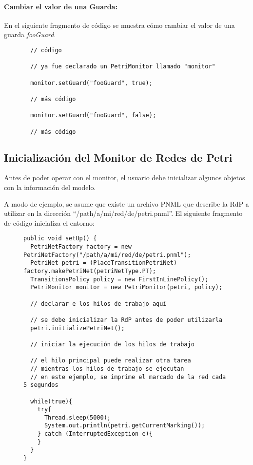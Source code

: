\paragraph{Cambiar el valor de una Guarda:} En el siguiente fragmento de código
se muestra cómo cambiar el valor de una guarda \textit{fooGuard}.

\begin{figure}[H]
\centering
\begin{verbatim}
  // código
  
  // ya fue declarado un PetriMonitor llamado "monitor"
  
  monitor.setGuard("fooGuard", true);
  
  // más código
  
  monitor.setGuard("fooGuard", false);
  
  // más código
\end{verbatim}
\end{figure}

\subsection{Inicialización del Monitor de Redes de Petri}

Antes de poder operar con el monitor, el usuario debe inicializar algunos
objetos con la información del modelo.

A modo de ejemplo, se asume que existe un archivo PNML que describe la RdP a
utilizar en la dirección ``/path/a/mi/red/de/petri.pnml''. El siguiente
fragmento de código inicializa  el entorno:

\begin{figure}[H]
\centering
\begin{verbatim}
public void setUp() {
  PetriNetFactory factory = new PetriNetFactory("/path/a/mi/red/de/petri.pnml");
  PetriNet petri = (PlaceTransitionPetriNet) factory.makePetriNet(petriNetType.PT);
  TransitionsPolicy policy = new FirstInLinePolicy();
  PetriMonitor monitor = new PetriMonitor(petri, policy);
  
  // declarar e los hilos de trabajo aquí
  
  // se debe inicializar la RdP antes de poder utilizarla
  petri.initializePetriNet();
  
  // iniciar la ejecución de los hilos de trabajo
  
  // el hilo principal puede realizar otra tarea
  // mientras los hilos de trabajo se ejecutan
  // en este ejemplo, se imprime el marcado de la red cada 5 segundos
  
  while(true){
    try{
      Thread.sleep(5000);
      System.out.println(petri.getCurrentMarking());
    } catch (InterruptedException e){
    }
  }
}
\end{verbatim}
\end{figure}


